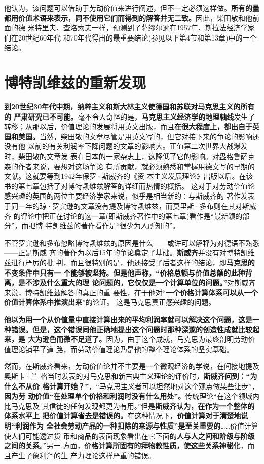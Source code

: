 他认为，该问题可以借助于劳动价值来进行阐述，但不一定必须这样做。\textbf{所有的量
  都用价值术语来表示，同不使用它们而得到的解答并无二致。}因此，柴田敬和他前面的德
米特里夫、查洛索夫一样，预测到了萨缪尔逊在1957年、斯拉法经济学家们在20世纪60年代
和70年代得出的最重要结论(参见以下第4节和第13章)中的一个结论。

\section{博特凯维兹的重新发现}

\textbf{到20世纪30年代中期，纳粹主义和斯大林主义使德国和苏联对马克思主义的所有的
  严肃研究已不可能。}毫不令人奇怪的是，\textbf{马克思主义经济学的地理轴线}发生了
转移；从那以后，价值理论的发展将用英文出版，而且\textbf{在很大程度上，都出自于英
  国和美国。}当然，柴田敬的文章尽管是用英文写的，但它对接下来的争论的影响还没有他
以前的有关利润率下降问题的文章的影响大。正值第二次世界大战爆发时，柴田敬的文章发
表在日本的一家杂志上，这降低了它的影响。对盎格鲁萨克森的作者来说，要想对这场争论
有所贡献，就必须熟悉和掌握用德文写的早期的文献。这就要等到1942年保罗·斯威齐的《资
本主义发展理论》出版以后。在该书的第七章包括了对博特凯维兹解答的详细而热情的概括。
这对于对劳动价值论感兴趣的英国的两位主要经济学家来说，似乎是相当新的：与斯威齐的
著作发表于同一年的琼·罗宾逊的文章没有提及博特凯维兹，而莫里斯·多布则在其对斯威齐
的评论中把正在讨论的这一章(即斯威齐著作中的第七章)看作是“最新颖的部分”，而把博
特凯维兹的著作看作是“很少为人所知的”。

不管罗宾逊和多布忽略博特凯维兹的原因是什么——或许可以解释为对德语不熟悉——正是斯威
齐的著作为以后15年的争论奠定了基础。\textbf{斯威齐}并没有对博特凯维兹进行严厉的批
判，而且很特别的是，他还接受了后者这样的结论，即\textbf{马克思的不变条件中只有一
  个能够被坚持。但是他声称，“价格总额与价值总额的此种背离，是不涉及什么重大的理
  论问题的，它仅仅是一个计算单位的问题。”}对斯威齐来说，博特凯维兹解答的真正的重
要性，在于他对“\textbf{一个价格计算体系可以从一个价值计算体系中推演出来}”的论证。
这是马克思真正感兴趣的问题。

\textbf{他以为用一个从价值量中直接计算出来的平均利润率就可以解决这个问题，这是一
  种错误。但是，这个错误同他正确地提出这个问题时那种深邃的创造性成就比较起来，是
  大为逊色而微不足道了。}因为，由于这个成就，马克思为最终剖明劳动价值理论铺平了道
路，而劳动价值理论乃是他的整个理论体系的坚实基础。

然而，在斯威齐看来，劳动价值论并不主要是一个微观经济的学说，在间接地提及奥斯卡·兰
格当时发表的对马克思和新古典主义理论的评价时，\textbf{斯威齐问到：“为什么不从价
  格计算开始？”}，“马克思主义者可以坦然地对这个观点做某些让步”，\textbf{因为劳
  动价值“在处理单个价格和利润时没有什么用处”。}传统理论“在这个领域内比马克思及
其信徒的任何发现都更为有用。”但是\textbf{斯威齐认为，在作为一个整体的体系水平上
  把价值计算省去是错误的。}在这种情况下，\textbf{价值计算对于清楚地说明“利润作为
  全社会劳动产品的一种扣除的来源与性质”是至关重要的}……价值计算使人们可能透过货
币和商品的表面现象看出在它下面的\textbf{人与人之间和阶级与阶级之间的关系}。”另一
方面，\textbf{价格计算所固有的拜物教性质，使这些关系神秘化}，而且产生了象利润的生
产力理论这样严重的错误。

